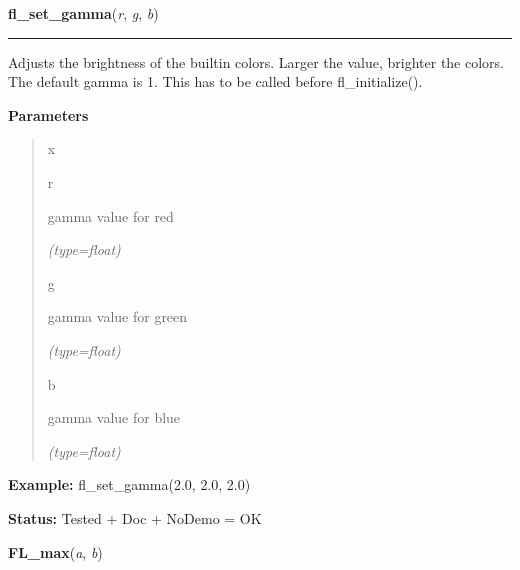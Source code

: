 \hspace{.8\funcindent}\begin{boxedminipage}{\funcwidth}

    \raggedright \textbf{fl\_set\_gamma}(\textit{r}, \textit{g}, \textit{b})

    \vspace{-1.5ex}

    \rule{\textwidth}{0.5\fboxrule}
\setlength{\parskip}{2ex}
    Adjusts the brightness of the builtin colors. Larger the value, 
    brighter the colors. The default gamma is 1. This has to be called 
    before fl\_initialize().

\setlength{\parskip}{1ex}
      \textbf{Parameters}
      \vspace{-1ex}

      \begin{quote}
        \begin{Ventry}{x}

          \item[r]

          gamma value for red

            {\it (type=float)}

          \item[g]

          gamma value for green

            {\it (type=float)}

          \item[b]

          gamma value for blue

            {\it (type=float)}

        \end{Ventry}

      \end{quote}

\textbf{Example:} fl\_set\_gamma(2.0, 2.0, 2.0)



\textbf{Status:} Tested + Doc + NoDemo = OK



    \end{boxedminipage}

    \label{xformslib:flbasic:FL_max}

    \vspace{0.5ex}

\hspace{.8\funcindent}\begin{boxedminipage}{\funcwidth}

    \raggedright \textbf{FL\_max}(\textit{a}, \textit{b})

\setlength{\parskip}{2ex}
\setlength{\parskip}{1ex}
    \end{boxedminipage}


